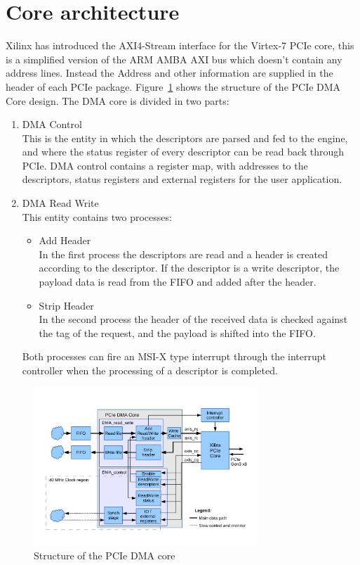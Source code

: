 \section{Core architecture}
Xilinx has introduced the AXI4-Stream interface \cite{ug761} for the Virtex-7 PCIe core, this is a simplified version of the ARM AMBA AXI bus \cite{arm}  which doesn't contain any address lines. Instead the Address and other information are supplied in the header of each PCIe package. Figure~\ref{fig:pcie_core_structure} shows the structure of the PCIe DMA Core design. The DMA core is divided in two parts:
\begin{enumerate}
\item DMA Control \\This is the entity in which the descriptors are parsed and fed to the engine, and where the status register of every descriptor can be read back through PCIe. DMA control contains a register map, with addresses to the descriptors, status registers and external registers for the user application.
\item DMA Read Write \\This entity contains two processes:
\begin{itemize}
\item Add Header\\In the first process the descriptors are read and a header is created according to the descriptor. If the descriptor is a write descriptor, the payload data is read from the FIFO and added after the header.
\item Strip Header\\In the second process the header of the received data is checked against the tag of the request, and the payload is shifted into the FIFO.
\end{itemize}
Both processes can fire an MSI-X type interrupt through the interrupt controller when the processing of a descriptor is completed.
\end{enumerate}
\begin{figure}[H]
\centering
\includegraphics[trim=0mm 0cm 0mm 1cm,width=0.75\textwidth, page=1]{pictures/dma_core_structure.pdf}
\caption{Structure of the PCIe DMA core}
\label{fig:pcie_core_structure}
\end{figure}
